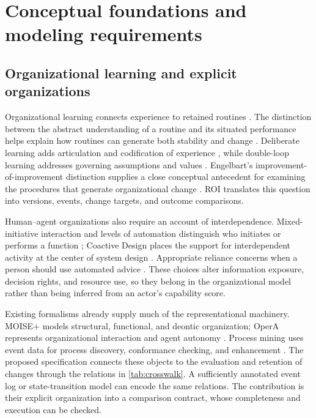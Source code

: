 \section{Conceptual foundations and modeling requirements}
\label{sec:foundations}
\subsection{Organizational learning and explicit organizations}
Organizational learning connects experience to retained routines \citep{levitt,march}. The distinction between the abstract understanding of a routine and its situated performance helps explain how routines can generate both stability and change \citep{feldman}. Deliberate learning adds articulation and codification of experience \citep{zollo}, while double-loop learning addresses governing assumptions and values \citep{argyris}. Engelbart's improvement-of-improvement distinction supplies a close conceptual antecedent for examining the procedures that generate organizational change \citep{engelbart}. ROI translates this question into versions, events, change targets, and outcome comparisons.

Human--agent organizations also require an account of interdependence. Mixed-initiative interaction and levels of automation distinguish who initiates or performs a function \citep{mixed,levels}; Coactive Design places the support for interdependent activity at the center of system design \citep{coactive}. Appropriate reliance concerns when a person should use automated advice \citep{lee}. These choices alter information exposure, decision rights, and resource use, so they belong in the organizational model rather than being inferred from an actor's capability score.

Existing formalisms already supply much of the representational machinery. MOISE+ models structural, functional, and deontic organization; OperA represents organizational interaction and agent autonomy \citep{moise,opera}. Process mining uses event data for process discovery, conformance checking, and enhancement \citep{processmining}. The proposed specification connects these objects to the evaluation and retention of changes through the relations in \cref{tab:crosswalk}. A sufficiently annotated event log or state-transition model can encode the same relations. The contribution is their explicit organization into a comparison contract, whose completeness and execution can be checked.

